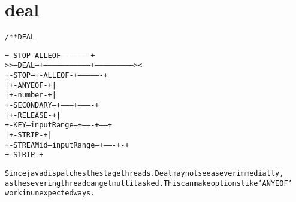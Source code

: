 \section{deal}
\begin{shaded}
\begin{alltt}
/** DEAL


            +-STOP--ALLEOF--------------------+
  >>--DEAL--+---------------------------------+--------------------------><
            +-STOP--+-ALLEOF-+----------------+
            |       +-ANYEOF-+                |
            |       +-number-+                |
            +-SECONDARY--+---------+----------+
            |            +-RELEASE-+          |
            +-KEY--inputRange--+-------+------+
            |                  +-STRIP-+      |
            +-STREAMid--inputRange--+-------+-+
                                    +-STRIP-+

  Since java dispatches the stage threads.  Deal may not see a sever immediatly,
  as the severing thread can get multitasked.  This can make options like 'ANYEOF' 
  work in unexpected ways. 

\end{alltt}
\end{shaded}
